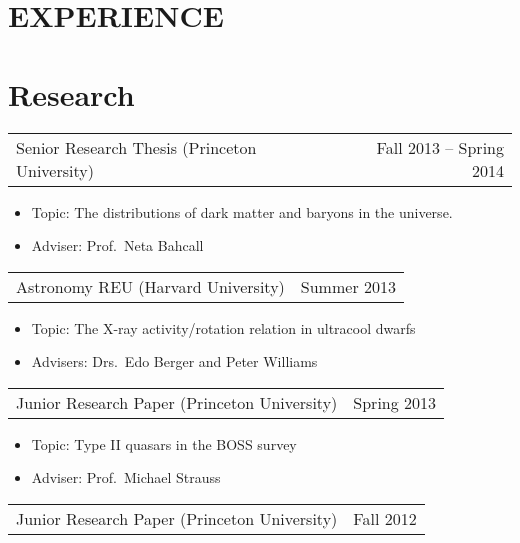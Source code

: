 \documentclass[margin]{res}
\begin{document}
\begin{resume}
\section{EXPERIENCE}      
\normalsize{\section{Research}}
				 \begin{tabular}{@{}p{4in} r}
				 Senior Research Thesis (Princeton
                                 University) & Fall 2013 -- Spring
                                 2014
				 \end{tabular}
				 \begin{itemize} \itemsep -2pt
				 \item[] Topic: The distributions of
                                   dark matter and baryons in the
                                   universe.
				 \item[] Adviser: Prof.~Neta Bahcall
				 \end{itemize}
				 \begin{tabular}{@{}p{4in} r}
				 Astronomy REU (Harvard University) &
                                 Summer 2013
				 \end{tabular}
				 \begin{itemize} \itemsep -2pt
				 \item[] Topic: The X-ray
                                   activity/rotation relation in
                                   ultracool dwarfs
				 \item[] Advisers: Drs.~Edo Berger and
                                   Peter Williams
				 \end{itemize}
				 \begin{tabular}{@{}p{4in} r}
				 Junior Research Paper (Princeton
                                 University) & Spring 2013
				 \end{tabular}
				 \begin{itemize} \itemsep -2pt
				 \item[] Topic: Type II quasars in the
                                   BOSS survey
				 \item[] Adviser: Prof.~Michael Strauss
				 \end{itemize}
				 \begin{tabular}{@{}p{4in} r}
				 Junior Research Paper (Princeton
                                 University) & Fall 2012
				 \end{tabular}
				 \begin{itemize} \itemsep -2pt

\end{itemize}
\end{resume}
\end{document}
